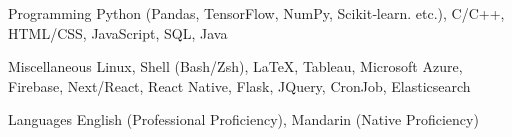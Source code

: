 

\begin{cvskills}

  \cvskill
    {Programming} %
    {Python (Pandas, TensorFlow, NumPy, Scikit‑learn. etc.),  C/C++, HTML/CSS, JavaScript, SQL, Java} %

  \cvskill
    {Miscellaneous} %
    {Linux, Shell (Bash/Zsh), \LaTeX, Tableau, Microsoft Azure, Firebase, Next/React, React Native, Flask, JQuery, CronJob, Elasticsearch} %
    
  \cvskill
    {Languages} %
    {English (Professional Proficiency), Mandarin (Native Proficiency)} %

\end{cvskills}
